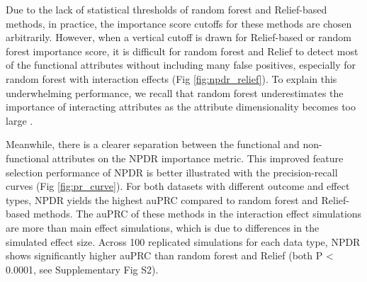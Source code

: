 \documentclass[10pt]{article}
\begin{document}
Due to the lack of statistical thresholds of random forest and Relief-based methods, in practice, the importance score cutoffs for these methods are chosen arbitrarily.
However, when a vertical cutoff is drawn for Relief-based or random forest importance score, it is difficult for random forest and Relief to detect most of the functional attributes without including many false positives, especially for random forest with interaction effects (Fig \ref{fig:npdr_relief}).
To explain this underwhelming performance, we recall that random forest underestimates the importance of interacting attributes as the attribute dimensionality becomes too large \cite{mckinney2009capturing,winham2012snp}.

Meanwhile, there is a clearer separation between the functional and non-functional attributes on the NPDR importance metric.
This improved feature selection performance of NPDR is better illustrated with the precision-recall curves (Fig \ref{fig:pr_curve}).
For both datasets with different outcome and effect types, NPDR yields the highest auPRC compared to random forest and Relief-based methods.
The auPRC of these methods in the interaction effect simulations are more than main effect simulations, which is due to differences in the simulated effect size.
Across 100 replicated simulations for each data type, NPDR shows significantly higher auPRC than random forest and Relief (both P < 0.0001, see Supplementary Fig S2).
\end{document}
